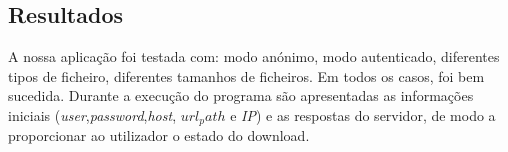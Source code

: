 \subsection*{Resultados}
A nossa aplicação foi testada com: modo anónimo, modo autenticado, diferentes tipos de ficheiro, diferentes tamanhos de ficheiros. Em todos os casos, foi bem sucedida.
Durante a execução do programa são apresentadas as informações iniciais (\textit{user},\textit{password},\textit{host}, \textit{$url_path$} e \textit{IP}) e as respostas do servidor, de modo a proporcionar ao utilizador o estado do download. 
